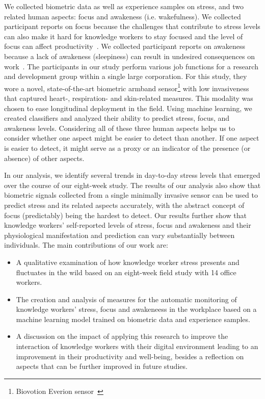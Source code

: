 We collected biometric data as well as
experience samples on stress, and two related human aspects: focus and
awakeness (i.e. wakefulness). We collected participant reports on focus because the
challenges that contribute to stress levels can also make it hard for
knowledge workers to stay focused and the level of focus
can affect
productivity~\cite{mark2014bored}.  We collected participant reports
on awakeness because a lack of awakeness (sleepiness) can result in
undesired consequences on work~\cite{connor02}.  The participants in
our study perform various job functions for a research and
development group within a single large corporation. For this study, they wore a novel, state-of-the-art
biometric armband sensor\footnote{Biovotion Everion
  sensor~\cite{everion}} with low invasiveness that captured heart-,
respiration- and skin-related measures. This modality was chosen to
ease longitudinal deployment in the field. Using machine learning, we
created classifiers and analyzed their ability to predict stress, focus, and awakeness levels. Considering all of these three human aspects helps us to consider whether one aspect might be easier to detect than another. If one aspect is easier to detect, it might serve
as a proxy or an indicator of the presence (or absence) of other aspects. 

In our analysis, we identify several trends in day-to-day stress levels
that emerged over the course of our eight-week study.  The results of
our analysis also show that biometric signals collected from a single
minimally invasive sensor can be used to predict stress and its
related aspects accurately, with the abstract concept of focus
(predictably) being the hardest to detect. Our results further show
that knowledge workers' self-reported levels of stress, focus and
awakeness and their physiological manifestation and prediction can
vary substantially between individuals.
The main contributions of our work are:
\begin{itemize}[topsep=0pt,itemsep=-1ex,partopsep=1ex,parsep=1ex]
	\item A qualitative examination of how knowledge worker stress presents and fluctuates in the wild based on an eight-week field study with 14 office workers.
	\item The creation and analysis of measures for the automatic monitoring of knowledge workers' stress, focus and awakeneess in the workplace based on a machine learning model trained on biometric data and experience samples.
	\item A discussion on the impact of applying this research to improve
the interaction of knowledge workers with their digital environment leading to an improvement in their productivity and well-being, besides a reflection on aspects that can be further improved in future studies.
    \end{itemize}

